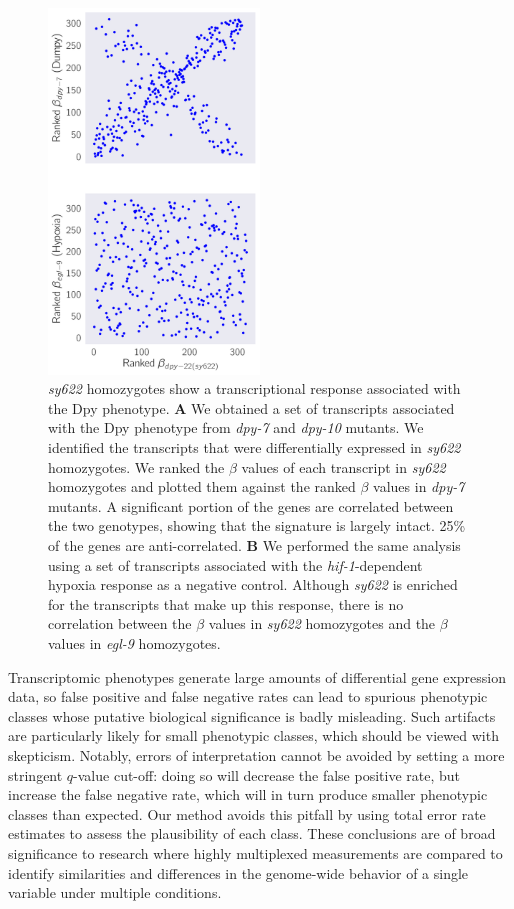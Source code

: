 \documentclass[8pt, twocolumn]{article}
\newcommand{\gene}[1]{\mbox{\emph{#1}}}
\begin{document}
\begin{figure}
  \centering{}
  \includegraphics[width=0.5\textwidth]{../../figs/dpy_response_ranked.pdf}
  \caption{
    \emph{sy622} homozygotes show a transcriptional response associated with the
    Dpy phenotype. \textbf{A} We obtained a set of transcripts associated with
    the Dpy phenotype from \gene{dpy-7} and \gene{dpy-10} mutants. We identified
    the transcripts that were differentially expressed in \emph{sy622}
    homozygotes. We ranked the $\beta$ values of each transcript in
    \emph{sy622} homozygotes and plotted them against the ranked $\beta$ values
    in \emph{dpy-7} mutants. A significant portion of the genes are correlated
    between the two genotypes, showing that the signature is largely intact.
    25\% of the genes are anti-correlated. \textbf{B} We performed the same
    analysis using a set of transcripts associated with the
    \gene{hif-1}-dependent hypoxia response as a negative control. Although
    \emph{sy622} is enriched for the transcripts that make up this response,
    there is no correlation between the $\beta$ values in \emph{sy622}
    homozygotes and the  $\beta$ values in \emph{egl-9} homozygotes.
    }
\label{fig:dpy_phenotype}
\end{figure}


Transcriptomic phenotypes generate large amounts of differential gene expression
data, so false positive and false negative rates can lead to spurious phenotypic
classes whose putative biological significance is badly misleading. Such
artifacts are particularly likely for small phenotypic classes, which should be
viewed with skepticism. Notably, errors of interpretation cannot be avoided by
setting a more stringent $q$-value cut-off: doing so will decrease the
false positive rate, but increase the false negative rate, which will in turn
produce smaller phenotypic classes than expected. Our method avoids this pitfall
by using total error rate estimates to assess the plausibility
of each class. These conclusions are of broad significance to research where
highly multiplexed measurements are compared to identify similarities and
differences in the genome-wide behavior of a single variable under multiple
conditions.
\end{document}
